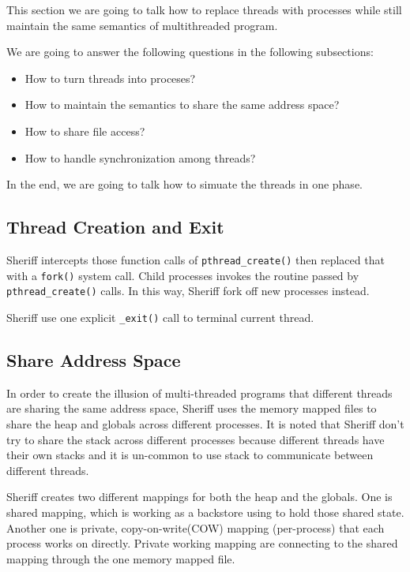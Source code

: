 \label{sec:simulation}

This section we are going to talk how to replace threads with processes while still maintain
the same semantics of multithreaded program.

We are going to answer the following questions in the following subsections:
\begin{itemize}
\item How to turn threads into proceses? 
\item How to maintain the semantics to share the same address space?
\item How to share file access?
\item How to handle synchronization among threads?
\end{itemize} 

In the end, we are going to talk how to simuate the threads in one phase.
\subsection{Thread Creation and Exit}
Sheriff intercepts those function calls of \texttt{pthread\_create()} then replaced that with a \texttt{fork()} system call.
Child processes invokes the routine passed by \texttt{pthread\_create()} calls. 
In this way, Sheriff fork off new processes instead. 

Sheriff use one explicit \texttt{\_exit()} call to terminal current thread.

\subsection{Share Address Space}
\label{simulation:sharememory}
In order to create the illusion of multi-threaded programs that 
different threads are sharing the same address space, 
Sheriff uses the memory mapped files to share the heap and globals across different processes.
It is noted that Sheriff don't try to share the stack across different processes 
because different threads have their own stacks and 
it is un-common to use stack to communicate between different threads.

Sheriff creates two different mappings for both the heap and the globals. 
One is shared mapping, which is working as a backstore using to hold those shared state. 
Another one is private, copy-on-write(COW) mapping (per-process) that each process works on directly.
Private working mapping are connecting to the shared mapping through the one memory mapped file.

